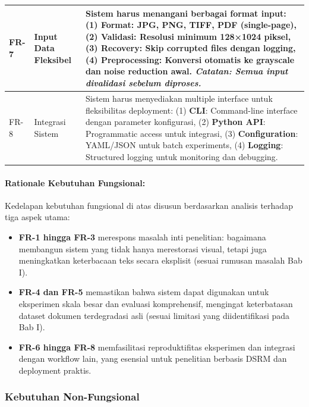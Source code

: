 \begin{table}[htbp!]
\begin{tabular}{p{}p{}p{}}
\midrule
FR-7 & Input Data Fleksibel & Sistem harus menangani berbagai format input: (1) \textbf{Format}: JPG, PNG, TIFF, PDF (single-page), (2) \textbf{Validasi}: Resolusi minimum 128×1024 piksel, (3) \textbf{Recovery}: Skip corrupted files dengan logging, (4) \textbf{Preprocessing}: Konversi otomatis ke grayscale dan noise reduction awal. \textit{Catatan: Semua input divalidasi sebelum diproses.} \\
\midrule
FR-8 & Integrasi Sistem & Sistem harus menyediakan multiple interface untuk fleksibilitas deployment: (1) \textbf{CLI}: Command-line interface dengan parameter konfigurasi, (2) \textbf{Python API}: Programmatic access untuk integrasi, (3) \textbf{Configuration}: YAML/JSON untuk batch experiments, (4) \textbf{Logging}: Structured logging untuk monitoring dan debugging. \\
\bottomrule
\end{tabular}
\end{table}

\paragraph{Rationale Kebutuhan Fungsional:}

Kedelapan kebutuhan fungsional di atas disusun berdasarkan analisis terhadap tiga aspek utama:

\begin{itemize}
    \item \textbf{FR-1 hingga FR-3} merespons masalah inti penelitian: bagaimana membangun sistem yang tidak hanya merestorasi visual, tetapi juga meningkatkan keterbacaan teks secara eksplisit (sesuai rumusan masalah Bab I).
    
    \item \textbf{FR-4 dan FR-5} memastikan bahwa sistem dapat digunakan untuk eksperimen skala besar dan evaluasi komprehensif, mengingat keterbatasan dataset dokumen terdegradasi asli (sesuai limitasi yang diidentifikasi pada Bab I).
    
    \item \textbf{FR-6 hingga FR-8} memfasilitasi reproduktifitas eksperimen dan integrasi dengan workflow lain, yang esensial untuk penelitian berbasis DSRM dan deployment praktis.
\end{itemize}

\subsubsection{Kebutuhan Non-Fungsional}
\label{subsubsec:non-functional-requirements}

